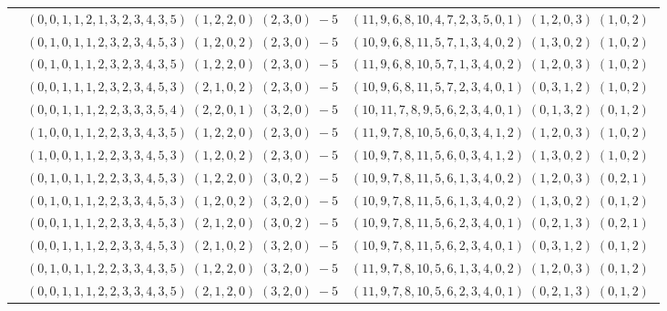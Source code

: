 \documentclass[11pt]{article}
\begin{document}
\begin{longtable}[l]{|c|c|c|}
 \cline{2-3} 
 & $(0 ,0 ,1 ,1 ,2 ,1 ,3 ,2 ,3 ,4 ,3 ,5) \;(1 ,2 ,2 ,0) \;(2 ,3 ,0) \;-5$ & $(11 ,9 ,6 ,8 ,10 ,4 ,7 ,2 ,3 ,5 ,0 ,1) \;(1 ,2 ,0 ,3) \;(1 ,0 ,2) \;$\\ 
 \cline{2-3} 
 & $(0 ,1 ,0 ,1 ,1 ,2 ,3 ,2 ,3 ,4 ,5 ,3) \;(1 ,2 ,0 ,2) \;(2 ,3 ,0) \;-5$ & $(10 ,9 ,6 ,8 ,11 ,5 ,7 ,1 ,3 ,4 ,0 ,2) \;(1 ,3 ,0 ,2) \;(1 ,0 ,2) \;$\\ 
 \cline{2-3} 
 & $(0 ,1 ,0 ,1 ,1 ,2 ,3 ,2 ,3 ,4 ,3 ,5) \;(1 ,2 ,2 ,0) \;(2 ,3 ,0) \;-5$ & $(11 ,9 ,6 ,8 ,10 ,5 ,7 ,1 ,3 ,4 ,0 ,2) \;(1 ,2 ,0 ,3) \;(1 ,0 ,2) \;$\\ 
 \cline{2-3} 
 & $(0 ,0 ,1 ,1 ,1 ,2 ,3 ,2 ,3 ,4 ,5 ,3) \;(2 ,1 ,0 ,2) \;(2 ,3 ,0) \;-5$ & $(10 ,9 ,6 ,8 ,11 ,5 ,7 ,2 ,3 ,4 ,0 ,1) \;(0 ,3 ,1 ,2) \;(1 ,0 ,2) \;$\\ 
 \cline{2-3} 
 & $(0 ,0 ,1 ,1 ,1 ,2 ,2 ,3 ,3 ,3 ,5 ,4) \;(2 ,2 ,0 ,1) \;(3 ,2 ,0) \;-5$ & $(10 ,11 ,7 ,8 ,9 ,5 ,6 ,2 ,3 ,4 ,0 ,1) \;(0 ,1 ,3 ,2) \;(0 ,1 ,2) \;$\\ 
 \cline{2-3} 
 & $(1 ,0 ,0 ,1 ,1 ,2 ,2 ,3 ,3 ,4 ,3 ,5) \;(1 ,2 ,2 ,0) \;(2 ,3 ,0) \;-5$ & $(11 ,9 ,7 ,8 ,10 ,5 ,6 ,0 ,3 ,4 ,1 ,2) \;(1 ,2 ,0 ,3) \;(1 ,0 ,2) \;$\\ 
 \cline{2-3} 
 & $(1 ,0 ,0 ,1 ,1 ,2 ,2 ,3 ,3 ,4 ,5 ,3) \;(1 ,2 ,0 ,2) \;(2 ,3 ,0) \;-5$ & $(10 ,9 ,7 ,8 ,11 ,5 ,6 ,0 ,3 ,4 ,1 ,2) \;(1 ,3 ,0 ,2) \;(1 ,0 ,2) \;$\\ 
 \cline{2-3} 
 & $(0 ,1 ,0 ,1 ,1 ,2 ,2 ,3 ,3 ,4 ,5 ,3) \;(1 ,2 ,2 ,0) \;(3 ,0 ,2) \;-5$ & $(10 ,9 ,7 ,8 ,11 ,5 ,6 ,1 ,3 ,4 ,0 ,2) \;(1 ,2 ,0 ,3) \;(0 ,2 ,1) \;$\\ 
 \cline{2-3} 
 & $(0 ,1 ,0 ,1 ,1 ,2 ,2 ,3 ,3 ,4 ,5 ,3) \;(1 ,2 ,0 ,2) \;(3 ,2 ,0) \;-5$ & $(10 ,9 ,7 ,8 ,11 ,5 ,6 ,1 ,3 ,4 ,0 ,2) \;(1 ,3 ,0 ,2) \;(0 ,1 ,2) \;$\\ 
 \cline{2-3} 
 & $(0 ,0 ,1 ,1 ,1 ,2 ,2 ,3 ,3 ,4 ,5 ,3) \;(2 ,1 ,2 ,0) \;(3 ,0 ,2) \;-5$ & $(10 ,9 ,7 ,8 ,11 ,5 ,6 ,2 ,3 ,4 ,0 ,1) \;(0 ,2 ,1 ,3) \;(0 ,2 ,1) \;$\\ 
 \cline{2-3} 
 & $(0 ,0 ,1 ,1 ,1 ,2 ,2 ,3 ,3 ,4 ,5 ,3) \;(2 ,1 ,0 ,2) \;(3 ,2 ,0) \;-5$ & $(10 ,9 ,7 ,8 ,11 ,5 ,6 ,2 ,3 ,4 ,0 ,1) \;(0 ,3 ,1 ,2) \;(0 ,1 ,2) \;$\\ 
 \cline{2-3} 
 & $(0 ,1 ,0 ,1 ,1 ,2 ,2 ,3 ,3 ,4 ,3 ,5) \;(1 ,2 ,2 ,0) \;(3 ,2 ,0) \;-5$ & $(11 ,9 ,7 ,8 ,10 ,5 ,6 ,1 ,3 ,4 ,0 ,2) \;(1 ,2 ,0 ,3) \;(0 ,1 ,2) \;$\\ 
 \cline{2-3} 
 & $(0 ,0 ,1 ,1 ,1 ,2 ,2 ,3 ,3 ,4 ,3 ,5) \;(2 ,1 ,2 ,0) \;(3 ,2 ,0) \;-5$ & $(11 ,9 ,7 ,8 ,10 ,5 ,6 ,2 ,3 ,4 ,0 ,1) \;(0 ,2 ,1 ,3) \;(0 ,1 ,2) \;$\\ 

\end{longtable}
\end{document}
